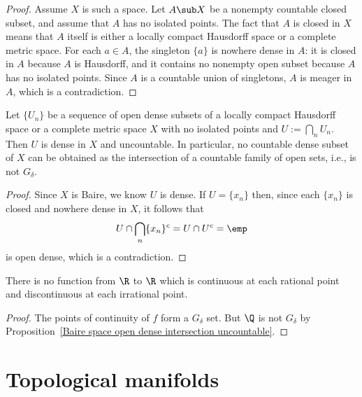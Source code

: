 \begin{proof}
Assume $X$ is such a space. Let $A\sub X$ be a nonempty countable closed subset, and assume that $A$ has no isolated points. The fact that $A$ is closed in $X$ means that $A$ itself is either a locally compact Hausdorff space or a complete metric space. For each $a\in A$, the singleton $\{a\}$ is nowhere dense in $A$: it is closed in $A$ because $A$ is Hausdorff, and it contains no nonempty open subset because $A$ has no isolated points. Since $A$ is a countable union of singletons, $A$ is meager in $A$, which is a contradiction.
\end{proof}
\begin{proposition}\label{Baire space open dense intersection uncountable}
Let $\{U_n\}$ be a sequence of open dense subsets of a locally compact Hausdorff space or a complete metric space $X$ with no isolated points and $U:=\bigcap_nU_n$. Then $U$ is dense in $X$ and uncountable. In particular, no countable dense subset of $X$ can be obtained as the intersection of a countable family of open sets, i.e., is not $G_\delta$.
\end{proposition}
\begin{proof}
Since $X$ is Baire, we know $U$ is dense. If $U=\{x_n\}$ then, since each $\{x_n\}$ is closed and nowhere dense in $X$, it follows that
\[U\cap\bigcap_n\{x_n\}^c=U\cap U^c=\emp\]
is open dense, which is a contradiction. 
\end{proof}
\begin{corollary}
There is no function from $\R$ to $\R$ which is continuous at each rational point and discontinuous at each irrational point.
\end{corollary}
\begin{proof}
The points of continuity of $f$ form a $G_\delta$ set. But $\Q$ is not $G_\delta$ by Proposition~\ref{Baire space open dense intersection uncountable}.
\end{proof}
\section{Topological manifolds}

